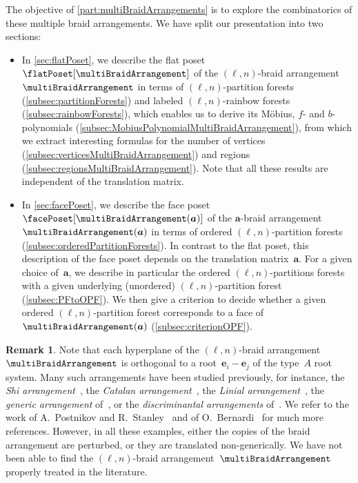 \documentclass{amsart}
\newcommand{\darkblue}{\color{darkblue}} %
\theoremstyle{definition}
\newtheorem{remark}[theorem]{Remark}
\renewcommand{\b}[1]{{\boldsymbol{#1}}} %
\newcommand{\defn}[1]{\textsl{\darkblue #1}} %
\renewcommand{\b}[1]{\boldsymbol{#1}} %
\begin{document}
The objective of \cref{part:multiBraidArrangements} is to explore the combinatorics of these multiple braid arrangements.
We have split our presentation into two sections:
\begin{itemize}
\item In \cref{sec:flatPoset}, we describe the flat poset~$\flatPoset[\multiBraidArrangement]$ of the $(\ell,n)$-braid arrangement~$\multiBraidArrangement$ in terms of $(\ell,n)$-partition forests (\cref{subsec:partitionForests}) and labeled $(\ell,n)$-rainbow forests (\cref{subsec:rainbowForests}), which enables us to derive its M\"obius, $f$- and $b$- polynomials (\cref{subsec:MobiusPolynomialMultiBraidArrangement}), from which we extract interesting formulas for the number of vertices (\cref{subsec:verticesMultiBraidArrangement}) and regions (\cref{subsec:regionsMultiBraidArrangement}). Note that all these results are independent of the translation matrix.
\item In \cref{sec:facePoset}, we describe the face poset~$\facePoset[\multiBraidArrangement(\b{a})]$ of the $\b{a}$-braid  arrangement~$\multiBraidArrangement(\b{a})$ in terms of ordered $(\ell,n)$-partition forests (\cref{subsec:orderedPartitionForests}). In contrast to the flat poset, this description of the face poset depends on the translation matrix~$\b{a}$. For a given choice of~$\b{a}$, we describe in particular the ordered $(\ell,n)$-partitions forests with a given underlying (unordered) $(\ell,n)$-partition forest (\cref{subsec:PFtoOPF}). We then give a criterion to decide whether a given ordered $(\ell,n)$-partition forest corresponds to a face of~$\multiBraidArrangement(\b{a})$ (\cref{subsec:criterionOPF}).
\end{itemize}

\begin{remark}
Note that each hyperplane of the $(\ell,n)$-braid arrangement~$\multiBraidArrangement$ is orthogonal to a root~$\b{e}_i-\b{e}_j$ of the type~$A$ root system.
Many such arrangements have been studied previously, for instance, the \defn{Shi arrangement}~\cite{Shi1, Shi2}, the \defn{Catalan arrangement}~\cite[Sect.~7]{PostnikovStanley}, the \defn{Linial arrangement}~\cite[Sect.~8]{PostnikovStanley}, the \defn{generic arrangement} of~\cite[Sect.~5]{PostnikovStanley}, or the \defn{discriminantal arrangements} of~\cite{ManinSchechtman,BayerBrandt}.
We refer to the work of A.~Postnikov and R.~Stanley~\cite{PostnikovStanley} and of O.~Bernardi~\cite{Bernardi} for much more references.
However, in all these examples, either the copies of the braid arrangement are perturbed, or they are translated non-generically.
We have not been able to find the $(\ell,n)$-braid arrangement~$\multiBraidArrangement$ properly treated in the literature.
\end{remark}
\end{document}
